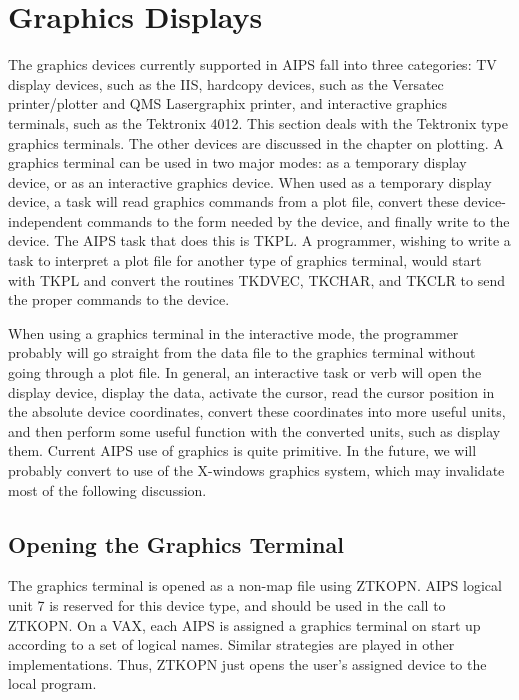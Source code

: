 \section{Graphics Displays}
The graphics devices currently supported in AIPS fall into three
categories: TV display devices, such as the IIS, hardcopy devices,
such as the Versatec printer/plotter and QMS Lasergraphix printer,
and interactive graphics terminals, such as the Tektronix 4012. This
section deals with the Tektronix type graphics terminals. The other
devices are discussed in the chapter on plotting. A graphics terminal
can be used in two major modes: as a temporary display device, or as
an interactive graphics device.  When used as a temporary display
device, a task will read graphics commands from a plot file, convert
these device-independent commands to the form needed by the device,
and finally write to the device.  The AIPS task that does this is
TKPL.  A programmer, wishing to write a task to interpret a plot file
for another type of graphics terminal, would start with TKPL and
convert the routines TKDVEC, TKCHAR, and TKCLR to send the proper
commands to the device.

When using a graphics terminal in the interactive mode, the
programmer probably will go straight from the data file to the
graphics terminal without going through a plot file.  In general, an
interactive task or verb will open the display device, display the
data, activate the cursor, read the cursor position in the absolute
device coordinates, convert these coordinates into more useful units,
and then perform some useful function with the converted units, such
as display them. Current AIPS use of graphics is quite primitive.  In
the future, we will probably convert to use of the X-windows graphics
system, which may invalidate most of the following discussion.

\subsection{Opening the Graphics Terminal}
The graphics terminal is opened as a non-map file using ZTKOPN. AIPS
logical unit 7 is reserved for this device type, and should be used in
the call to ZTKOPN.  On a VAX, each AIPS is assigned a graphics
terminal on start up according to a set of logical names.  Similar
strategies are played in other implementations. Thus, ZTKOPN just opens
the user's assigned device to the local program.

